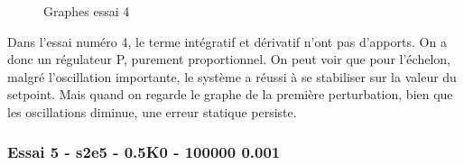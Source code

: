 \begin{figure}[H]
    \centering
    \caption{Graphes essai 4}
    \label{fig:essai-4}
\end{figure}

Dans l'essai numéro 4, le terme intégratif et dérivatif n'ont pas d'apports.
On a donc un régulateur P, purement proportionnel. On peut voir que pour 
l'échelon, malgré l'oscillation importante, le système a réussi à se stabiliser
sur la valeur du setpoint. Mais quand on regarde le graphe de la première perturbation,
bien que les oscillations diminue, une erreur statique persiste.


\subsubsection{Essai 5 - s2e5 - 0.5K0 - 100000 0.001}

